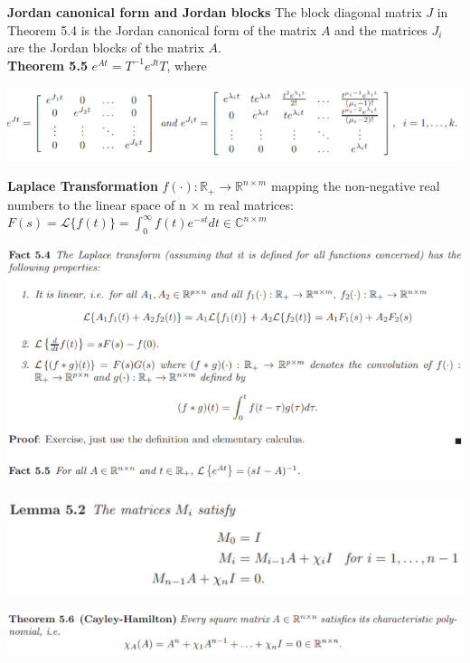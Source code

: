 \documentclass[10pt,landscape]{article}
\newenvironment{Figure}
{\par\medskip\noindent\minipage{\linewidth}}
{\endminipage\par\medskip}
\begin{document}
\begin{multicols*}{4}
\textbf{Jordan canonical form and Jordan blocks} The block diagonal matrix $J$ in Theorem 5.4 is the Jordan canonical form of the
matrix $A$ and the matrices $J_i$ are the Jordan blocks of the matrix $A$.\\

\textbf{Theorem 5.5} $e^{At} = T^{-1}e^{Jt}T$, where
\begin{Figure}
	\centering
	\includegraphics[width=\linewidth]{pictures/Th5_5.png}
\end{Figure}

\textbf{Laplace Transformation} $f(\cdot): \mathbb{R}_+ \rightarrow \mathbb{R}^{n \times m}$ mapping the non-negative real numbers to the linear space of n × m real matrices: $F(s) = \mathcal{L} \{f(t) \} = \int_0^\infty f(t)e^{-st}dt \in \mathbb{C}^{n \times m}$\\

\begin{Figure}
	\centering
	\includegraphics[width=\linewidth]{pictures/Fac5_5.png}
\end{Figure}

\begin{Figure}
	\centering
	\includegraphics[width=\linewidth]{pictures/Lem5_2.png}
\end{Figure}

\begin{Figure}
	\centering
	\includegraphics[width=\linewidth]{pictures/Th5_6.png}
\end{Figure}


\end{multicols*}
\end{document}
